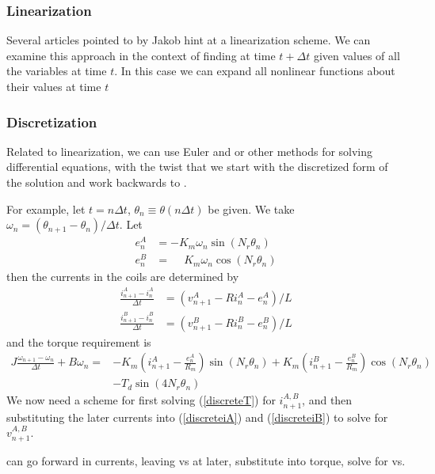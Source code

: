 \documentclass{article}
\begin{document}
\begin{appendix}
\subsubsection{Linearization}
Several articles pointed to by Jakob hint at a linearization scheme. We can examine this approach in the context of finding \vsol at time $t+\Delta t$ given values of all the variables at time $t$. In this case we can expand all nonlinear functions about their values at time $t$

\subsubsection{Discretization}
Related to linearization, we can use Euler and or other methods for solving differential equations, with the twist that we start with the discretized form of the solution and work backwards to \vsol. 

For example, let $t = n \Delta t$, $\theta_n \equiv \theta(n \Delta t)$  be given. We take $\omega_n = (\theta_{n+1} - \theta_n)/\Delta t$. Let 
\begin{align}	
e^A_n &= -K_m \omega_n \sin(N_r \theta_n)\label{discreteeA}\\
e^B_n &= \phantom{-}K_m \omega_n \cos(N_r \theta_n)\label{discreteeB}
\end{align}
then the currents in the coils are determined by
\begin{align}
\frac{i_{n+1}^A - {i_n^A}}{\Delta t} &= (v^A_{n+1}- R i_n^A - e^A_n)/L \label{discreteiA}\\
\frac{i_{n+1}^B - {i_n^B}}{\Delta t} &= (v^B_{n+1}- R i_n^B - e^B_n)/L \label{discreteiB}
\end{align}
and the torque requirement is
\begin{equation}\label{discreteT}
\begin{split}
J \frac{\omega_{n+1}-\omega_n}{\Delta t} + B \omega_n =& -K_m \left(i^A_{n+1} - \frac{e^A_n}{R_m}\right) \sin(N_r\theta_n) + K_m \left(i^B_{n+1} - \frac{e^B_n}{R_m}\right)\cos(N_r\theta_n)\\
 &- T_d \sin(4N_r\theta_n)
\end{split}
\end{equation}
We now need a scheme for first solving (\ref{discreteT}) for $i^{A,B}_{n+1}$, and then substituting the later currents into (\ref{discreteiA}) and (\ref{discreteiB}) to solve for $v^{A,B}_{n+1}$. 

can go forward in currents, leaving vs at later, substitute into torque, solve for vs. 


\end{appendix}
\end{document}
